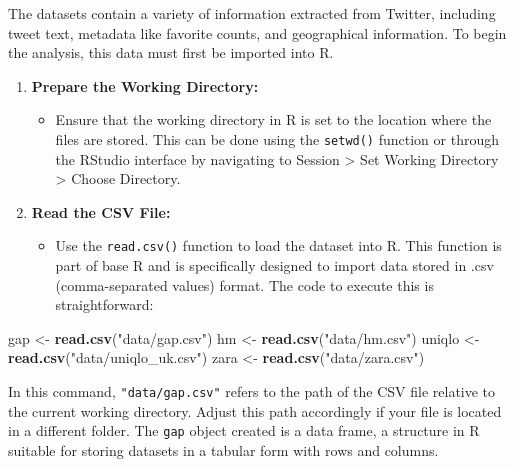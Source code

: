 \documentclass[
]{book}
\newenvironment{Shaded}{\begin{snugshade}}{\end{snugshade}}
\newcommand{\FunctionTok}[1]{\textcolor[rgb]{0.13,0.29,0.53}{\textbf{#1}}}
\newcommand{\NormalTok}[1]{#1}
\newcommand{\OtherTok}[1]{\textcolor[rgb]{0.56,0.35,0.01}{#1}}
\newcommand{\StringTok}[1]{\textcolor[rgb]{0.31,0.60,0.02}{#1}}
\providecommand{\tightlist}{%
  \setlength{\itemsep}{0pt}\setlength{\parskip}{0pt}}
\begin{document}
The datasets contain a variety of information extracted from Twitter, including tweet text, metadata like favorite counts, and geographical information. To begin the analysis, this data must first be imported into R.

\begin{enumerate}
\def\labelenumi{\arabic{enumi}.}
\tightlist
\item
  \textbf{Prepare the Working Directory:}

  \begin{itemize}
  \tightlist
  \item
    Ensure that the working directory in R is set to the location where the files are stored. This can be done using the \texttt{setwd()} function or through the RStudio interface by navigating to Session \textgreater{} Set Working Directory \textgreater{} Choose Directory.
  \end{itemize}
\item
  \textbf{Read the CSV File:}

  \begin{itemize}
  \tightlist
  \item
    Use the \texttt{read.csv()} function to load the dataset into R. This function is part of base R and is specifically designed to import data stored in .csv (comma-separated values) format. The code to execute this is straightforward:
  \end{itemize}
\end{enumerate}

\begin{Shaded}
\begin{Highlighting}[]
\NormalTok{gap }\OtherTok{\textless{}{-}} \FunctionTok{read.csv}\NormalTok{(}\StringTok{"data/gap.csv"}\NormalTok{)}
\NormalTok{hm }\OtherTok{\textless{}{-}} \FunctionTok{read.csv}\NormalTok{(}\StringTok{"data/hm.csv"}\NormalTok{)}
\NormalTok{uniqlo }\OtherTok{\textless{}{-}} \FunctionTok{read.csv}\NormalTok{(}\StringTok{"data/uniqlo\_uk.csv"}\NormalTok{)}
\NormalTok{zara }\OtherTok{\textless{}{-}} \FunctionTok{read.csv}\NormalTok{(}\StringTok{"data/zara.csv"}\NormalTok{)}
\end{Highlighting}
\end{Shaded}

In this command, \texttt{"data/gap.csv"} refers to the path of the CSV file relative to the current working directory. Adjust this path accordingly if your file is located in a different folder. The \texttt{gap} object created is a data frame, a structure in R suitable for storing datasets in a tabular form with rows and columns.
\end{document}
